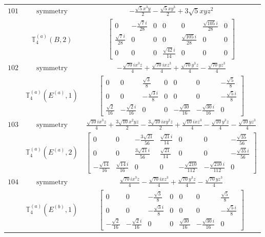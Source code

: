 \documentclass[fleqn,8pt,landscape]{jsarticle}
\begin{document}
\begin{longtable}{ccc}
$ 101 $ & $ \text{symmetry} $ & $ - \frac{\sqrt{5} x^{3} y}{2} - \frac{\sqrt{5} x y^{3}}{2} + 3 \sqrt{5} x y z^{2} $ \\
$  $ & $ \mathbb{T}_{4}^{(a)}(B,2) $ & $ \begin{bmatrix} 0 & - \frac{\sqrt{7} i}{28} & 0 & 0 & 0 & \frac{\sqrt{105} i}{28} & 0 \\ \frac{\sqrt{7} i}{28} & 0 & 0 & 0 & \frac{\sqrt{105} i}{28} & 0 & 0 \\ 0 & 0 & 0 & \frac{\sqrt{42} i}{14} & 0 & 0 & 0 \end{bmatrix} $ \\ \hline
$ 102 $ & $ \text{symmetry} $ & $ - \frac{\sqrt{70} i x^{3} z}{4} + \frac{\sqrt{70} i x z^{3}}{4} + \frac{\sqrt{70} y^{3} z}{4} - \frac{\sqrt{70} y z^{3}}{4} $ \\
$  $ & $ \mathbb{T}_{4}^{(a)}(E^{(a)},1) $ & $ \begin{bmatrix} 0 & 0 & \frac{\sqrt{3}}{8} & 0 & 0 & 0 & - \frac{\sqrt{5}}{8} \\ 0 & 0 & - \frac{\sqrt{3} i}{8} & 0 & 0 & 0 & - \frac{\sqrt{5} i}{8} \\ \frac{\sqrt{2}}{16} & - \frac{\sqrt{2} i}{16} & 0 & 0 & - \frac{\sqrt{30}}{16} & - \frac{\sqrt{30} i}{16} & 0 \end{bmatrix} $ \\ \hline
$ 103 $ & $ \text{symmetry} $ & $ \frac{\sqrt{10} i x^{3} z}{4} + \frac{3 \sqrt{10} x^{2} y z}{2} - \frac{3 \sqrt{10} i x y^{2} z}{2} + \frac{\sqrt{10} i x z^{3}}{4} - \frac{\sqrt{10} y^{3} z}{4} - \frac{\sqrt{10} y z^{3}}{4} $ \\
$  $ & $ \mathbb{T}_{4}^{(a)}(E^{(a)},2) $ & $ \begin{bmatrix} 0 & 0 & - \frac{3 \sqrt{21}}{56} & \frac{\sqrt{21} i}{14} & 0 & 0 & - \frac{\sqrt{35}}{56} \\ 0 & 0 & \frac{3 \sqrt{21} i}{56} & \frac{\sqrt{21}}{14} & 0 & 0 & - \frac{\sqrt{35} i}{56} \\ - \frac{\sqrt{14}}{16} & \frac{\sqrt{14} i}{16} & 0 & 0 & - \frac{\sqrt{210}}{112} & - \frac{\sqrt{210} i}{112} & 0 \end{bmatrix} $ \\ \hline
$ 104 $ & $ \text{symmetry} $ & $ \frac{\sqrt{70} i x^{3} z}{4} - \frac{\sqrt{70} i x z^{3}}{4} + \frac{\sqrt{70} y^{3} z}{4} - \frac{\sqrt{70} y z^{3}}{4} $ \\
$  $ & $ \mathbb{T}_{4}^{(a)}(E^{(b)},1) $ & $ \begin{bmatrix} 0 & 0 & - \frac{\sqrt{3}}{8} & 0 & 0 & 0 & \frac{\sqrt{5}}{8} \\ 0 & 0 & - \frac{\sqrt{3} i}{8} & 0 & 0 & 0 & - \frac{\sqrt{5} i}{8} \\ - \frac{\sqrt{2}}{16} & - \frac{\sqrt{2} i}{16} & 0 & 0 & \frac{\sqrt{30}}{16} & - \frac{\sqrt{30} i}{16} & 0 \end{bmatrix} $ \\ \hline

\end{longtable}
\end{document}
